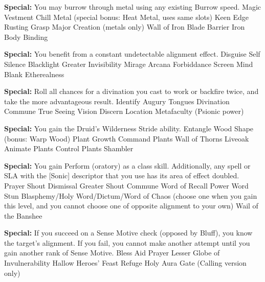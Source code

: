 \begin{multicols}{2}
\textbf{Special: }{You may burrow through metal using any existing Burrow speed.}
\sphere
{Magic Vestment}
{Chill Metal (special bonus: Heat Metal, uses same slots)}
{Keen Edge}
{Rusting Grasp}
{Major Creation (metals only)}
{Wall of Iron}
{Blade Barrier}
{Iron Body}
{Binding}

\textbf{Special: }{You benefit from a constant undetectable alignment effect.}
\sphere
{Disguise Self}
{Silence}
{Blacklight}
{Greater Invisibility}
{Mirage Arcana}
{Forbiddance}
{Screen}
{Mind Blank}
{Etherealness}

\textbf{Special: }{Roll all chances for a divination you cast to work or backfire twice, and take the more advantageous result.}
\sphere
{Identify}
{Augury}
{Tongues}
{Divination}
{Commune}
{True Seeing}
{Vision}
{Discern Location}
{Metafaculty (Psionic power)}

\textbf{Special: }{You gain the Druid's Wilderness Stride ability.}
\sphere
{Entangle}
{Wood Shape (bonus: Warp Wood)}
{Plant Growth}
{Command Plants}
{Wall of Thorns}
{Liveoak}
{Animate Plants}
{Control Plants}
{Shambler}

\textbf{Special: }{You gain Perform (oratory) as a class skill. Additionally, any spell or SLA with the [Sonic] descriptor that you use has its area of effect doubled.}
\sphere
{Prayer}
{Shout}
{Dismissal}
{Greater Shout}
{Commune}
{Word of Recall}
{Power Word Stun}
{Blasphemy/Holy Word/Dictum/Word of Chaos (choose one when you gain this level, and you cannot choose one of opposite alignment to your own)}
{Wail of the Banshee}

\textbf{Special: }{If you succeed on a Sense Motive check (opposed by Bluff), you know the target's alignment. If you fail, you cannot make another attempt until you gain another rank of Sense Motive.}
\sphere
{Bless}
{Aid}
{Prayer}
{Lesser Globe of Invulnerability}
{Hallow}
{Heroes' Feast}
{Refuge}
{Holy Aura}
{Gate (Calling version only)}


\end{multicols}
